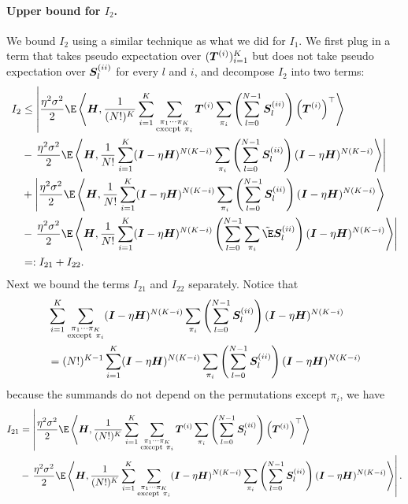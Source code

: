 \paragraph{Upper bound for $I_2$.}We bound $I_2$ using a similar technique as what we did for $I_1$. We first plug in a term that takes pseudo expectation over $({\bm{T}}^{(i)})_{i=1}^K$ but does not take pseudo expectation over ${\bm{S}}_l^{(ii)}$ for every $l$ and $i$, and decompose $I_2$ into two terms:
\begin{align*}
    I_2&\leq \left|\frac{\eta^2\sigma^2}{2}\E\inp{\mH}{\frac{1}{(N!)^K}\sum_{i=1}^K\sum_{\substack{\pi_1\cdots \pi_K \\ \text{except} ~\pi_i}}\mT^{(i)}\sum_{\pi_i}\left(\sum_{l=0}^{N-1}\mS_l^{(ii)}\right)\left(\mT^{(i)}\right)^{\top}}\right. \\
    &-\left.\frac{\eta^2\sigma^2}{2}\E\inp{\mH}{\frac{1}{N!}\sum_{i=1}^K(\mI-\eta\mH)^{N(K-i)}\sum_{\pi_i}\left(\sum_{l=0}^{N-1}\mS_l^{(ii)}\right)(\mI-\eta\mH)^{N(K-i)}}\right| \\
    &+ \left|\frac{\eta^2\sigma^2}{2}\E\inp{\mH}{\frac{1}{N!}\sum_{i=1}^K(\mI-\eta\mH)^{N(K-i)}\sum_{\pi_i}\left(\sum_{l=0}^{N-1}\mS_l^{(ii)}\right)(\mI-\eta\mH)^{N(K-i)}}\right. \\
    &-\left.\frac{\eta^2\sigma^2}{2}\E\inp{\mH}{\frac{1}{N!}\sum_{i=1}^K(\mI-\eta\mH)^{N(K-i)}\left(\sum_{l=0}^{N-1}\sum_{\pi_i}\fakeE \mS_l^{(ii)}\right)(\mI-\eta\mH)^{N(K-i)}}\right| \\
    &=:I_{21}+I_{22}.
\end{align*}
Next we bound the terms $I_{21}$ and $I_{22}$ separately. Notice that 
\begin{align*}
    &\sum_{i=1}^K\sum_{\substack{\pi_1\cdots \pi_K \\ \text{except} ~\pi_i}}({\bm{I}}-\eta{\bm{H}})^{N(K-i)}\sum_{\pi_i}\left(\sum_{l=0}^{N-1}{\bm{S}}_l^{(ii)}\right)({\bm{I}}-\eta{\bm{H}})^{N(K-i)}\\
    &=(N!)^{K-1}\sum_{\substack{i=1}}^K({\bm{I}}-\eta{\bm{H}})^{N(K-i)}\sum_{\pi_i}\left(\sum_{l=0}^{N-1}{\bm{S}}_l^{(ii)}\right)({\bm{I}}-\eta{\bm{H}})^{N(K-i)}
\end{align*}
because the summands do not depend on the permutations except $\pi_i$, we have
\begin{align*}
    I_{21}&=\left|\frac{\eta^2\sigma^2}{2}\E\inp{\mH}{\frac{1}{(N!)^K}\sum_{i=1}^K\sum_{\substack{\pi_1\cdots \pi_K \\ \text{except} ~\pi_i}}\mT^{(i)}\sum_{\pi_i}\left(\sum_{l=0}^{N-1}\mS_l^{(ii)}\right)\left(\mT^{(i)}\right)^{\top}}\right. \\
    &-\left.\frac{\eta^2\sigma^2}{2}\E\inp{\mH}{\frac{1}{(N!)^K}\sum_{i=1}^K\sum_{\substack{\pi_1\cdots \pi_K \\ \text{except} ~\pi_i}}(\mI-\eta\mH)^{N(K-i)}\sum_{\pi_i}\left(\sum_{l=0}^{N-1}\mS_l^{(ii)}\right)(\mI-\eta\mH)^{N(K-i)}}\right|. \\   
\end{align*}
